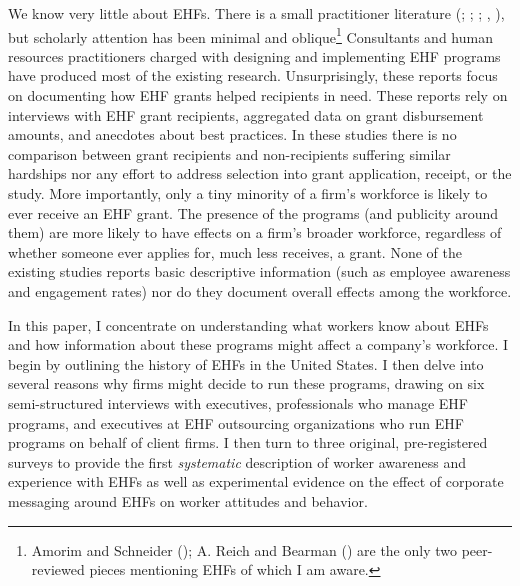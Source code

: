 \documentclass[
  11pt,
  oneside]{article}
\begin{document}
We know very little about EHFs. There is a small practitioner literature (; ; ; , ), but scholarly attention has been minimal and oblique\footnote{Amorim and Schneider (); A. Reich and Bearman () are the only two peer-reviewed pieces mentioning EHFs of which I am aware.} Consultants and human resources practitioners charged with designing and implementing EHF programs have produced most of the existing research. Unsurprisingly, these reports focus on documenting how EHF grants helped recipients in need. These reports rely on interviews with EHF grant recipients, aggregated data on grant disbursement amounts, and anecdotes about best practices. In these studies there is no comparison between grant recipients and non-recipients suffering similar hardships nor any effort to address selection into grant application, receipt, or the study. More importantly, only a tiny minority of a firm's workforce is likely to ever receive an EHF grant. The presence of the programs (and publicity around them) are more likely to have effects on a firm's broader workforce, regardless of whether someone ever applies for, much less receives, a grant. None of the existing studies reports basic descriptive information (such as employee awareness and engagement rates) nor do they document overall effects among the workforce.

In this paper, I concentrate on understanding what workers know about EHFs and how information about these programs might affect a company's workforce. I begin by outlining the history of EHFs in the United States. I then delve into several reasons why firms might decide to run these programs, drawing on six semi-structured interviews with executives, professionals who manage EHF programs, and executives at EHF outsourcing organizations who run EHF programs on behalf of client firms. I then turn to three original, pre-registered surveys to provide the first \emph{systematic} description of worker awareness and experience with EHFs as well as experimental evidence on the effect of corporate messaging around EHFs on worker attitudes and behavior.
\end{document}

